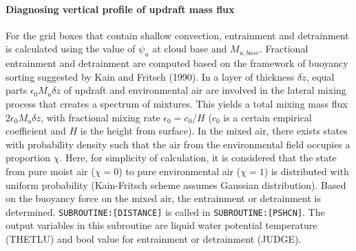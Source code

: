 \hypertarget{diagnosing-vertical-profile-of-updraft-mass-flux}{%
\paragraph{Diagnosing vertical profile of updraft mass flux}\label{diagnosing-vertical-profile-of-updraft-mass-flux}}

For the grid boxes that contain shallow convection, entrainment and detrainment is calculated using the value of \(\psi_u\) at cloud base and \(M_{u,base}\). Fractional entrainment and detrainment are
computed based on the framework of buoyancy sorting suggested by Kain and Fritsch (1990). In a layer of thickness \(\delta z\), equal parts \(\epsilon_0 M_u \delta z\) of updraft and environmental air
are involved in the lateral mixing process that creates a spectrum of mixtures. This yields a total mixing mass flux \(2\epsilon_0 M_u \delta z\), with fractional mixing rate \(\epsilon_0=c_0/H\)
(\(c_0\) is a certain empirical coefficient and \(H\) is the height from surface). In the mixed air, there exists states with probability density such that the air from the environmental field
occupies a proportion \(\chi\). Here, for simplicity of calculation, it is considered that the state from pure moist air (\(\chi=0\)) to pure environmental air (\(\chi=1\)) is distributed with uniform
probability (Kain-Fritsch scheme assumes Gaussian distribution). Based on the buoyancy force on the mixed air, the entrainment or detrainment is determined. \texttt{SUBROUTINE:{[}DISTANCE{]}} is
called in \texttt{SUBROUTINE:{[}PSHCN{]}}. The output variables in this subroutine are liquid water potential temperature (THETLU) and bool value for entrainment or detrainment (JUDGE).

